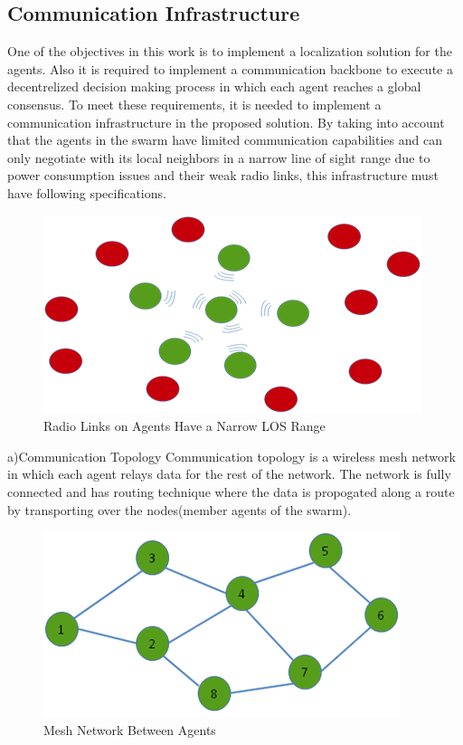 \subsection{Communication Infrastructure}
One of the objectives in this work is to implement a localization solution for the agents. Also it is required to implement a communication backbone to execute a decentrelized decision making process in which each agent reaches a global consensus. To meet these requirements, it is needed to implement a communication infrastructure in the proposed solution. By taking into account that the agents in the swarm have limited communication capabilities and can only negotiate with its local neighbors in a narrow line of sight range due to power consumption issues and their weak radio links, this infrastructure must have following specifications.

\begin{figure}[H]
\caption{Radio Links on Agents Have a Narrow LOS Range}
\centering
\includegraphics[scale = 1]{narrow_los}
\end{figure}

a)Communication Topology \newline
Communication topology is a wireless mesh network in which each agent relays data for the rest of the network. The network is fully connected and has routing technique where the data is propogated along a route by transporting over the nodes(member agents of the swarm).

\begin{figure}[H]
\caption{Mesh Network Between Agents}
\centering
\includegraphics[scale = 1]{mesh}
\end{figure} 

